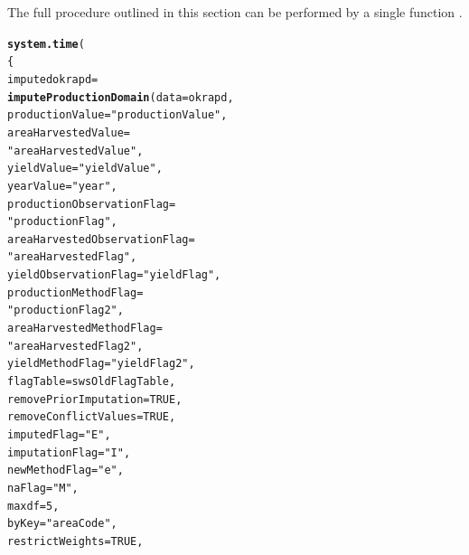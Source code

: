 \documentclass[nojss]{jss}\usepackage[]{graphicx}\usepackage[]{color}
\makeatletter
\newcommand{\hlnum}[1]{\textcolor[rgb]{0.686,0.059,0.569}{#1}}%
\newcommand{\hlstr}[1]{\textcolor[rgb]{0.192,0.494,0.8}{#1}}%
\newcommand{\hlstd}[1]{\textcolor[rgb]{0.345,0.345,0.345}{#1}}%
\newcommand{\hlkwb}[1]{\textcolor[rgb]{0.69,0.353,0.396}{#1}}%
\newcommand{\hlkwc}[1]{\textcolor[rgb]{0.333,0.667,0.333}{#1}}%
\newcommand{\hlkwd}[1]{\textcolor[rgb]{0.737,0.353,0.396}{\textbf{#1}}}%
\newenvironment{kframe}{%
 \def\at@end@of@kframe{}%
 \ifinner\ifhmode%
  \def\at@end@of@kframe{\end{minipage}}%
  \begin{minipage}{\columnwidth}%
 \fi\fi%
 \def\FrameCommand##1{\hskip\@totalleftmargin \hskip-\fboxsep
 \colorbox{shadecolor}{##1}\hskip-\fboxsep
     \hskip-\linewidth \hskip-\@totalleftmargin \hskip\columnwidth}%
 \MakeFramed {\advance\hsize-\width
   \@totalleftmargin\z@ \linewidth\hsize
   \@setminipage}}%
 {\par\unskip\endMakeFramed%
 \at@end@of@kframe}
\newenvironment{knitrout}{}{} %
\makeatother
\begin{document}
The full procedure outlined in this section can be performed by a
single function .


\begin{knitrout}
\color{fgcolor}\begin{kframe}
\begin{alltt}
\hlkwd{system.time}\hlstd{(}
    \hlstd{\{}
        \hlstd{imputedokrapd} \hlkwb{=}
            \hlkwd{imputeProductionDomain}\hlstd{(}\hlkwc{data} \hlstd{= okrapd,}
                                   \hlkwc{productionValue} \hlstd{=} \hlstr{"productionValue"}\hlstd{,}
                                   \hlkwc{areaHarvestedValue} \hlstd{=}
                                       \hlstr{"areaHarvestedValue"}\hlstd{,}
                                   \hlkwc{yieldValue} \hlstd{=} \hlstr{"yieldValue"}\hlstd{,}
                                   \hlkwc{yearValue} \hlstd{=} \hlstr{"year"}\hlstd{,}
                                   \hlkwc{productionObservationFlag} \hlstd{=}
                                       \hlstr{"productionFlag"}\hlstd{,}
                                   \hlkwc{areaHarvestedObservationFlag} \hlstd{=}
                                       \hlstr{"areaHarvestedFlag"}\hlstd{,}
                                   \hlkwc{yieldObservationFlag} \hlstd{=} \hlstr{"yieldFlag"}\hlstd{,}
                                   \hlkwc{productionMethodFlag} \hlstd{=}
                                       \hlstr{"productionFlag2"}\hlstd{,}
                                   \hlkwc{areaHarvestedMethodFlag} \hlstd{=}
                                       \hlstr{"areaHarvestedFlag2"}\hlstd{,}
                                   \hlkwc{yieldMethodFlag} \hlstd{=} \hlstr{"yieldFlag2"}\hlstd{,}
                                   \hlkwc{flagTable} \hlstd{= swsOldFlagTable,}
                                   \hlkwc{removePriorImputation} \hlstd{=} \hlnum{TRUE}\hlstd{,}
                                   \hlkwc{removeConflictValues} \hlstd{=} \hlnum{TRUE}\hlstd{,}
                                   \hlkwc{imputedFlag} \hlstd{=} \hlstr{"E"}\hlstd{,}
                                   \hlkwc{imputationFlag} \hlstd{=} \hlstr{"I"}\hlstd{,}
                                   \hlkwc{newMethodFlag} \hlstd{=} \hlstr{"e"}\hlstd{,}
                                   \hlkwc{naFlag} \hlstd{=} \hlstr{"M"}\hlstd{,}
                                   \hlkwc{maxdf} \hlstd{=} \hlnum{5}\hlstd{,}
                                   \hlkwc{byKey} \hlstd{=} \hlstr{"areaCode"}\hlstd{,}
                                   \hlkwc{restrictWeights} \hlstd{=} \hlnum{TRUE}\hlstd{,}

\end{alltt}
\end{kframe}
\end{knitrout}
\end{document}
